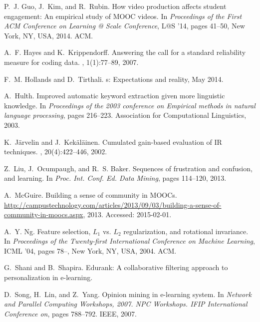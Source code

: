 \documentclass{edm_template}
\begin{document}
\begin{thebibliography}{10}
P.~J. Guo, J.~Kim, and R.~Rubin.
\newblock How video production affects student engagement: An empirical study
  of {MOOC} videos.
\newblock In {\em Proceedings of the First ACM Conference on Learning @ Scale
  Conference}, L@S '14, pages 41--50, New York, NY, USA, 2014. ACM.

A.~F. Hayes and K.~Krippendorff.
\newblock Answering the call for a standard reliability measure for coding
  data.
, 1(1):77--89, 2007.

F.~M. Hollands and D.~Tirthali.
s: Expectations and reality, May 2014.

A.~Hulth.
\newblock Improved automatic keyword extraction given more linguistic
  knowledge.
\newblock In {\em Proceedings of the 2003 conference on Empirical methods in
  natural language processing}, pages 216--223. Association for Computational
  Linguistics, 2003.

K.~J{\"a}rvelin and J.~Kek{\"a}l{\"a}inen.
\newblock Cumulated gain-based evaluation of {IR} techniques.
, 20(4):422--446,
  2002.

Z.~Liu, J.~Ocumpaugh, and R.~S. Baker.
\newblock Sequences of frustration and confusion, and learning.
\newblock In {\em Proc. Int. Conf. Ed. Data Mining}, pages 114--120, 2013.

A.~McGuire.
\newblock Building a sense of community in {MOOC}s.
\newblock
  \url{http://campustechnology.com/articles/2013/09/03/building-a-sense-of-community-in-moocs.aspx},
  2013.
\newblock Accessed: 2015-02-01.

A.~Y. Ng.
\newblock Feature selection, {$L_{1}$} vs. {$L_{2}$} regularization, and
  rotational invariance.
\newblock In {\em Proceedings of the Twenty-first International Conference on
  Machine Learning}, ICML '04, pages 78--, New York, NY, USA, 2004. ACM.

G.~Shani and B.~Shapira.
\newblock Edurank: A collaborative filtering approach to personalization in
  e-learning.

D.~Song, H.~Lin, and Z.~Yang.
\newblock Opinion mining in e-learning system.
\newblock In {\em Network and Parallel Computing Workshops, 2007. NPC
  Workshops. IFIP International Conference on}, pages 788--792. IEEE, 2007.


\end{thebibliography}
\end{document}
